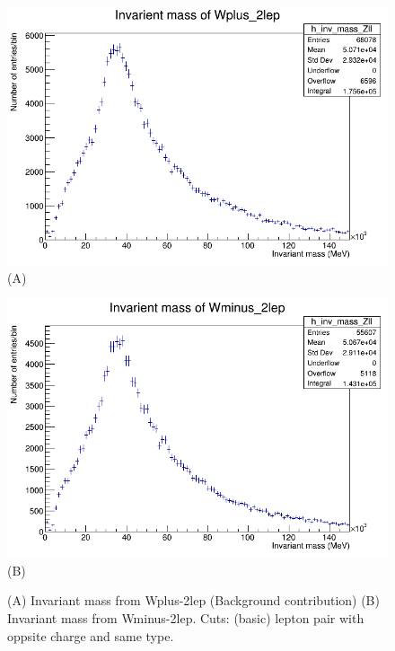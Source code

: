 \begin{figure}[h!]
    \centering
    \begin{minipage}{0.5\textwidth}
        \centering
        \includegraphics[width=\linewidth]{plots/18-02-2021/Invarient mass of Wplus_2lep 18-02-2021_14_49 .png}
        (A)
    \end{minipage}\hfill
    \begin{minipage}{0.5\textwidth}
        \centering
        \includegraphics[width=\linewidth]{plots/18-02-2021/Wminus-2lep_invar-mass_18-02-21_14-54.png}
        (B)
    \end{minipage}
    \caption{(A) Invariant mass from Wplus-2lep (Background contribution) (B) Invariant mass from Wminus-2lep.  Cuts: (basic) lepton pair with oppsite charge and same type.}
    \label{fig:14-40_18-02-2021}
\end{figure}


